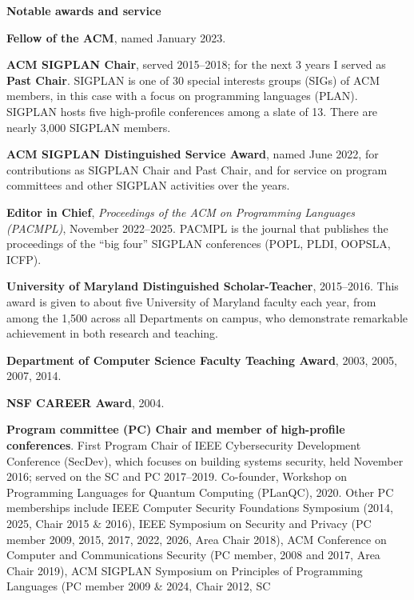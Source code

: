 \documentclass[11pt]{article}
\begin{document}
\begin{description}
\setlength{\labelsep}{0ex}
\setlength{\itemsep}{-0.5ex}


        \item {\bf\textsf Notable awards and service}

\item \textbf{Fellow of the ACM}, named January 2023.
\item \textbf{ACM SIGPLAN Chair}, served 2015--2018; for the next 3
  years I served as \textbf{Past Chair}. SIGPLAN is
  one of 30 special interests groups (SIGs) of ACM members, in this
  case with a focus on programming languages (PLAN). SIGPLAN hosts
  five high-profile conferences among a slate of 13. There are nearly
  3,000 SIGPLAN members.
\item \textbf{ACM SIGPLAN Distinguished Service Award}, named June
  2022, for contributions as SIGPLAN Chair and Past Chair, and for service on
  program committees and other SIGPLAN activities over the years.
\item \textbf{Editor in Chief}, \emph{Proceedings of the ACM on Programming Languages (PACMPL)}, November 2022--2025. PACMPL is the journal that publishes the proceedings of the ``big four'' SIGPLAN conferences (POPL, PLDI, OOPSLA, ICFP).
\item \textbf{University of Maryland Distinguished Scholar-Teacher},
  2015--2016. This award is given to about five University of Maryland
  faculty each year, from among the 1,500 across all Departments on
  campus, who demonstrate remarkable achievement in both research and
  teaching.
 \item \textbf{Department of Computer Science Faculty Teaching Award}, 2003,
   2005, 2007, 2014.
 \item \textbf{NSF CAREER Award}, 2004.
\item \textbf{Program committee (PC) Chair and member of high-profile
    conferences}. First Program Chair of IEEE Cybersecurity
  Development Conference (SecDev), which focuses on building systems
  security, held November 2016; served on the SC and PC 2017--2019. Co-founder, Workshop on Programming Languages for Quantum Computing (PLanQC), 2020. 
  Other PC memberships include IEEE
  Computer Security Foundations Symposium (2014, 2025, Chair 2015 \& 2016), IEEE
  Symposium on Security and Privacy (PC member 2009, 2015, 2017,
  2022, 2026, Area Chair 2018), ACM Conference on Computer and Communications Security (PC
  member, 2008 and 2017, Area Chair 2019), ACM SIGPLAN Symposium on
  Principles of Programming Languages (PC member 2009 \& 2024, Chair 2012, SC

\end{description}
\end{document}
